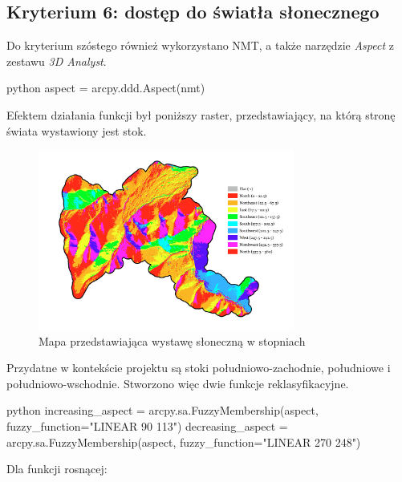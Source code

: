 \documentclass{article}
\begin{document}
\subsection{Kryterium 6: dostęp do światła słonecznego}

Do kryterium szóstego również wykorzystano NMT, a także narzędzie \textit{Aspect} z zestawu \textit{3D Analyst}.
\vspace{5pt}

\begin{mintedbox}{python}
aspect = arcpy.ddd.Aspect(nmt)
\end{mintedbox}
\vspace{10pt}

Efektem działania funkcji był poniższy raster, przedstawiający, na którą stronę świata wystawiony jest stok.
\vspace{5pt}

\begin{figure}[H]
    \centering
    \includegraphics[width=0.75\textwidth]{img/kryterium6-aspect.jpg}
    \caption{Mapa przedstawiająca wystawę słoneczną w stopniach}
\end{figure}
\vspace{10pt}

Przydatne w kontekście projektu są stoki południowo-zachodnie, południowe i południowo-wschodnie. 
Stworzono więc dwie funkcje reklasyfikacyjne.

\begin{mintedbox}{python}
increasing_aspect = arcpy.sa.FuzzyMembership(aspect, fuzzy_function="LINEAR 90 113")
decreasing_aspect = arcpy.sa.FuzzyMembership(aspect, fuzzy_function="LINEAR 270 248")
\end{mintedbox}

\vspace{10pt}

Dla funkcji rosnącej:
\end{document}
